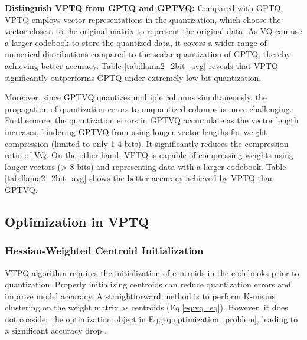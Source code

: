 \textbf{Distinguish VPTQ from GPTQ and GPTVQ:}
Compared with GPTQ, VPTQ employs vector representations in the quantization, which choose the vector closest to the original matrix to represent the original data. 
As VQ can use a larger codebook to store the quantized data, it covers a wider range of numerical distributions compared to the scalar quantization of GPTQ, thereby achieving better accuracy. 
Table \ref{tab:llama2_2bit_avg} reveals that VPTQ significantly outperforms GPTQ under extremely low bit quantization.


Moreover, since GPTVQ quantizes multiple columns simultaneously, the propagation of quantization errors to unquantized columns is more challenging.
Furthermore, the quantization errors in GPTVQ accumulate as the vector length increases, hindering GPTVQ from using longer vector lengths for weight compression (limited to only 1-4 bits). 
It significantly reduces the compression ratio of VQ. 
On the other hand, VPTQ is capable of compressing weights using longer vectors (> $8$ bits) and representing data with a larger codebook. Table \ref{tab:llama2_2bit_avg} shows the better accuracy achieved by VPTQ than GPTVQ.







\subsection{Optimization in VPTQ} \label{sec:vptq_optimization}

\subsubsection{Hessian-Weighted Centroid Initialization} \label{sec:hessian_weight_centroid}

VTPQ algorithm requires the initialization of centroids in the codebooks prior to quantization. 
Properly initializing centroids can reduce quantization errors and improve model accuracy. 
A straightforward method is to perform K-means clustering on the weight matrix as centroids (Eq.\ref{eq:vq_eq}). 
However, it does not consider the optimization object in Eq.\ref{eq:optimization_problem}, leading to a significant accuracy drop \citep{GPTVQ, AQLM}.

